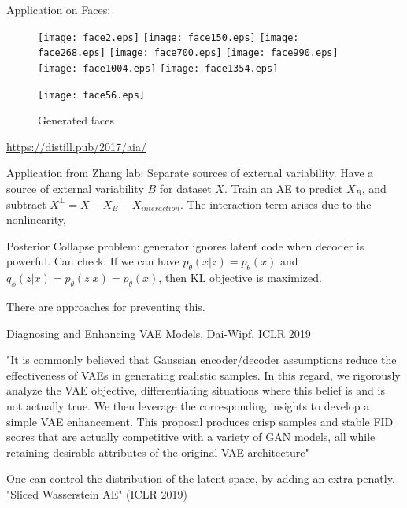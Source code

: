 \documentclass[english]{article}
\begin{document}
\item 

Application on Faces:
\begin{figure}[H]\centering
\texttt{[image: face2.eps]}
\texttt{[image: face150.eps]}
\texttt{[image: face268.eps]}
\texttt{[image: face700.eps]}
\texttt{[image: face990.eps]}
\texttt{[image: face1004.eps]}
\texttt{[image: face1354.eps]}
\end{figure}

\begin{figure}[H]\centering
\texttt{[image: face56.eps]}
\caption{Generated faces}
\end{figure}



\url{https://distill.pub/2017/aia/}

\item Application from Zhang lab: Separate sources of external variability. Have a source of external variability $B$ for dataset $X$. Train an AE to predict $X_B$, and subtract $X^\perp = X-X_B-X_{interaction}$. The interaction term arises due to the nonlinearity,  

\item Posterior Collapse problem: generator ignores latent code when decoder is powerful. Can check: If we can have $p_\theta(x|z) = p_\theta(x)$ and $q_\phi(z|x)=p_\theta(z|x)=p_\theta(x)$, then KL objective is maximized. 

There are approaches for preventing this. 

\item Diagnosing and Enhancing VAE Models, Dai-Wipf, ICLR 2019

"It is commonly believed that Gaussian encoder/decoder assumptions reduce the
effectiveness of VAEs in generating realistic samples. In this regard, we rigorously analyze
the VAE objective, differentiating situations where this belief is and is not actually true.
We then leverage the corresponding insights to develop a simple VAE enhancement. This proposal
produces crisp samples and stable FID scores that are actually competitive with a variety
of GAN models, all while retaining desirable attributes of the original VAE architecture"

\item One can control the distribution of the latent space, by adding an extra penatly. "Sliced Wasserstein AE" (ICLR 2019)
\end{document}
